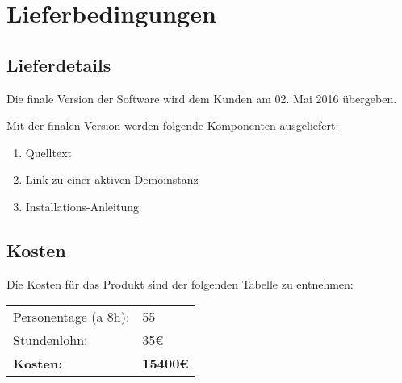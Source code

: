 
\chapter{Lieferbedingungen}
\section{Lieferdetails}
Die finale Version der Software wird dem Kunden am 02. Mai 2016 übergeben.

Mit der finalen Version werden folgende Komponenten ausgeliefert:
\begin{enumerate}
	\item Quelltext
	\item Link zu einer aktiven Demoinstanz
	\item Installations-Anleitung
\end{enumerate}


\section{Kosten}
Die Kosten für das Produkt sind der folgenden Tabelle zu entnehmen:
\begin{table}[H]
\begin{tabularx}{\textwidth}{|l|l|}
\toprule
Personentage (a 8h): & 55 \\
Stundenlohn: & 35\euro \\ \hline
\textbf{Kosten:} & \textbf{15400\euro} \\

\hline
\end{tabularx}
\end{table}